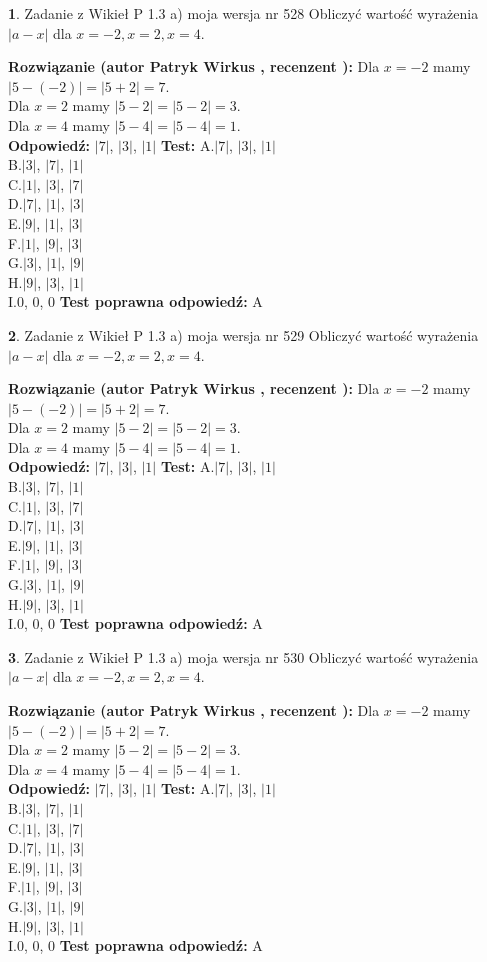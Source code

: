 \documentclass[12pt, a4paper]{article}
\theoremstyle{definition} %
\newtheorem{zad}{}
\newcommand{\zadStart}[1]{\begin{zad}#1\newline}
\newcommand{\zadStop}{\end{zad}}
\newcommand{\rozwStart}[2]{\noindent \textbf{Rozwiązanie (autor #1 , recenzent #2): }\newline}
\newcommand{\rozwStop}{\newline}
\newcommand{\odpStart}{\noindent \textbf{Odpowiedź:}\newline}
\newcommand{\odpStop}{\newline}
\newcommand{\testStart}{\noindent \textbf{Test:}\newline}
\newcommand{\testStop}{\newline}
\newcommand{\kluczStart}{\noindent \textbf{Test poprawna odpowiedź:}\newline}
\newcommand{\kluczStop}{\newline}
\begin{document}
\zadStart{Zadanie z Wikieł P 1.3 a) moja wersja nr 528}
Obliczyć wartość wyrażenia $|a - x|$ dla $x=-2,x=2,x=4$.
\zadStop
\rozwStart{Patryk Wirkus}{}
Dla $x = -2$ mamy $|5 - (-2)| = |5 + 2| = 7$.\\
Dla $x = 2$ mamy $|5 - 2| = |5 - 2| = 3$.\\
Dla $x = 4$ mamy $|5 - 4| = |5 - 4| = 1$.\\
\rozwStop
\odpStart
$|7|$, $|3|$, $|1|$
\odpStop
\testStart
A.$|7|$, $|3|$, $|1|$\\
B.$|3|$, $|7|$, $|1|$\\
C.$|1|$, $|3|$, $|7|$\\
D.$|7|$, $|1|$, $|3|$\\
E.$|9|$, $|1|$, $|3|$\\
F.$|1|$, $|9|$, $|3|$\\
G.$|3|$, $|1|$, $|9|$\\
H.$|9|$, $|3|$, $|1|$\\
I.$0$, $0$, $0$
\testStop
\kluczStart
A
\kluczStop



\zadStart{Zadanie z Wikieł P 1.3 a) moja wersja nr 529}
Obliczyć wartość wyrażenia $|a - x|$ dla $x=-2,x=2,x=4$.
\zadStop
\rozwStart{Patryk Wirkus}{}
Dla $x = -2$ mamy $|5 - (-2)| = |5 + 2| = 7$.\\
Dla $x = 2$ mamy $|5 - 2| = |5 - 2| = 3$.\\
Dla $x = 4$ mamy $|5 - 4| = |5 - 4| = 1$.\\
\rozwStop
\odpStart
$|7|$, $|3|$, $|1|$
\odpStop
\testStart
A.$|7|$, $|3|$, $|1|$\\
B.$|3|$, $|7|$, $|1|$\\
C.$|1|$, $|3|$, $|7|$\\
D.$|7|$, $|1|$, $|3|$\\
E.$|9|$, $|1|$, $|3|$\\
F.$|1|$, $|9|$, $|3|$\\
G.$|3|$, $|1|$, $|9|$\\
H.$|9|$, $|3|$, $|1|$\\
I.$0$, $0$, $0$
\testStop
\kluczStart
A
\kluczStop



\zadStart{Zadanie z Wikieł P 1.3 a) moja wersja nr 530}
Obliczyć wartość wyrażenia $|a - x|$ dla $x=-2,x=2,x=4$.
\zadStop
\rozwStart{Patryk Wirkus}{}
Dla $x = -2$ mamy $|5 - (-2)| = |5 + 2| = 7$.\\
Dla $x = 2$ mamy $|5 - 2| = |5 - 2| = 3$.\\
Dla $x = 4$ mamy $|5 - 4| = |5 - 4| = 1$.\\
\rozwStop
\odpStart
$|7|$, $|3|$, $|1|$
\odpStop
\testStart
A.$|7|$, $|3|$, $|1|$\\
B.$|3|$, $|7|$, $|1|$\\
C.$|1|$, $|3|$, $|7|$\\
D.$|7|$, $|1|$, $|3|$\\
E.$|9|$, $|1|$, $|3|$\\
F.$|1|$, $|9|$, $|3|$\\
G.$|3|$, $|1|$, $|9|$\\
H.$|9|$, $|3|$, $|1|$\\
I.$0$, $0$, $0$
\testStop
\kluczStart
A
\kluczStop
\end{document}
